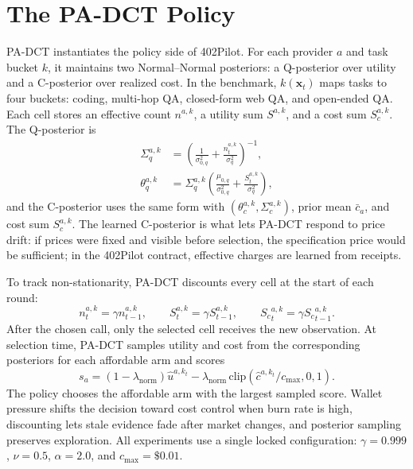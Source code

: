 \documentclass[sigconf, nonacm]{acmart}
\newcommand{\lamn}{\lambda_{\mathrm{norm}}}
\DeclareRobustCommand{\padct}{PA\nobreakdash-DCT}
\newcommand{\thetaq}[2]{\theta_q^{#1,#2}}
\newcommand{\thetac}[2]{\theta_c^{#1,#2}}
\newcommand{\Sigmaq}[2]{\Sigma_q^{#1,#2}}
\newcommand{\Sigmac}[2]{\Sigma_c^{#1,#2}}
\newcommand{\hatu}[2]{\hat u^{#1,#2}}
\newcommand{\hatc}[2]{\hat c^{#1,#2}}
\begin{document}
\section{\texorpdfstring{The \padct{} Policy}{The PA-DCT Policy}}
\label{sec:method}

\padct{} instantiates the policy side of 402Pilot. For each provider $a$ and task bucket $k$, it maintains two Normal--Normal posteriors: a Q-posterior over utility and a C-posterior over realized cost. In the benchmark, $k(\mathbf{x}_t)$ maps tasks to four buckets: coding, multi-hop QA, closed-form web QA, and open-ended QA. Each cell stores an effective count $n^{a,k}$, a utility sum $S^{a,k}$, and a cost sum $S_c^{a,k}$. The Q-posterior is
\begin{equation}
\label{eq:posterior-short}
\begin{aligned}
\Sigmaq{a}{k}
&=\left(\frac{1}{\sigma^2_{0,q}}+\frac{n^{a,k}_t}{\sigma^2_q}\right)^{-1},\\
\thetaq{a}{k}
&=\Sigmaq{a}{k}\left(\frac{\mu_{0,q}}{\sigma^2_{0,q}}+\frac{S^{a,k}_t}{\sigma^2_q}\right),
\end{aligned}
\end{equation}
and the C-posterior uses the same form with $(\thetac{a}{k},\Sigmac{a}{k})$, prior mean $\bar c_a$, and cost sum $S_c^{a,k}$. The learned C-posterior is what lets \padct{} respond to price drift: if prices were fixed and visible before selection, the specification price would be sufficient; in the 402Pilot contract, effective charges are learned from receipts.

To track non-stationarity, \padct{} discounts every cell at the start of each round:
\begin{equation}
n^{a,k}_t=\gamma n^{a,k}_{t-1},\qquad
S^{a,k}_t=\gamma S^{a,k}_{t-1},\qquad
{S_c}^{a,k}_t=\gamma {S_c}^{a,k}_{t-1}.
\end{equation}
After the chosen call, only the selected cell receives the new observation. At selection time, \padct{} samples utility and cost from the corresponding posteriors for each affordable arm and scores
\begin{equation}
\label{eq:score-short}
s_a=(1-\lamn)\hatu{a}{k_t}
  - \lamn\,\mathrm{clip}(\hatc{a}{k_t}/c_{\max},0,1).
\end{equation}
The policy chooses the affordable arm with the largest sampled score. Wallet pressure shifts the decision toward cost control when burn rate is high, discounting lets stale evidence fade after market changes, and posterior sampling preserves exploration. All experiments use a single locked configuration: $\gamma=0.999$, $\nu=0.5$, $\alpha=2.0$, and $c_{\max}=\$0.01$.
\end{document}
